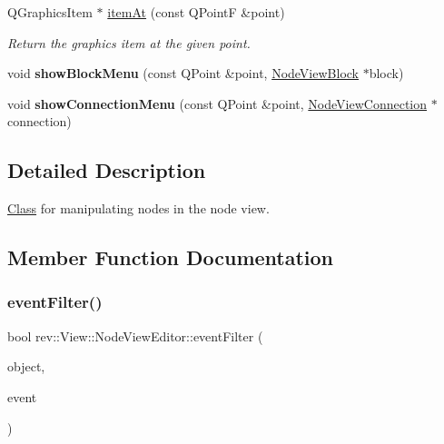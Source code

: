 \begin{DoxyCompactItemize}
Q\+Graphics\+Item $\ast$ \mbox{\hyperlink{classrev_1_1_view_1_1_node_view_editor_a4d8fd4e5053de3c296f703464e7977a8}{item\+At}} (const Q\+PointF \&point)
\begin{DoxyCompactList}\small\item\em Return the graphics item at the given point. \end{DoxyCompactList}\item 
\mbox{\label{classrev_1_1_view_1_1_node_view_editor_a6da473f88e7b7ada16420bfd0a99aa22}} 
void {\bfseries show\+Block\+Menu} (const Q\+Point \&point, \mbox{\hyperlink{classrev_1_1_view_1_1_node_view_block}{Node\+View\+Block}} $\ast$block)
\item 
\mbox{\label{classrev_1_1_view_1_1_node_view_editor_aca1fdc6a61b38c6c9b3f2576faf62f71}} 
void {\bfseries show\+Connection\+Menu} (const Q\+Point \&point, \mbox{\hyperlink{classrev_1_1_view_1_1_node_view_connection}{Node\+View\+Connection}} $\ast$connection)
\end{DoxyCompactItemize}


\subsection{Detailed Description}
\mbox{\hyperlink{struct_class}{Class}} for manipulating nodes in the node view. 

\subsection{Member Function Documentation}
\mbox{\label{classrev_1_1_view_1_1_node_view_editor_a909735398dd3e02ed57ed8b51ef6f760}} 
\subsubsection{\texorpdfstring{eventFilter()}{eventFilter()}}
{\footnotesize\ttfamily bool rev\+::\+View\+::\+Node\+View\+Editor\+::event\+Filter (\begin{DoxyParamCaption}\item[{Q\+Object $\ast$}]{object,  }\item[{Q\+Event $\ast$}]{event }\end{DoxyParamCaption})}



